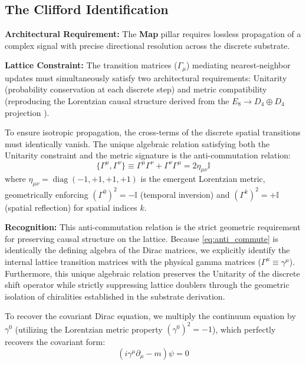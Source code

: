 \subsection{The Clifford Identification}

\textbf{Architectural Requirement:} The \textbf{Map} pillar requires lossless propagation of a complex signal with precise directional resolution across the discrete substrate.

\textbf{Lattice Constraint:} The transition matrices ($\Gamma_\mu$) mediating nearest-neighbor updates must simultaneously satisfy two architectural requirements: Unitarity (probability conservation at each discrete step) and metric compatibility (reproducing the Lorentzian causal structure derived from the $E_8 \to D_4 \oplus D_4$ projection \cite{meyer_informational_2026}). 

To ensure isotropic propagation, the cross-terms of the discrete spatial transitions must identically vanish. The unique algebraic relation satisfying both the Unitarity constraint and the metric signature is the anti-commutation relation:
\begin{equation}
    \{\Gamma^\mu, \Gamma^\nu\} \equiv \Gamma^\mu\Gamma^\nu + \Gamma^\nu\Gamma^\mu = 2\eta_{\mu\nu}\mathbb{I}
\label{eq:anti_commute}
\end{equation}
where $\eta_{\mu\nu} = \operatorname{diag}(-1,+1,+1,+1)$ is the emergent Lorentzian metric, geometrically enforcing $(\Gamma^0)^2 = -\mathbb{I}$ (temporal inversion) and $(\Gamma^k)^2 = +\mathbb{I}$ (spatial reflection) for spatial indices $k$.

\textbf{Recognition:} This anti-commutation relation is the strict geometric requirement for preserving causal structure on the lattice. Because \cref{eq:anti_commute} is identically the defining algebra of the Dirac matrices, we explicitly identify the internal lattice transition matrices with the physical gamma matrices ($\Gamma^\mu \equiv \gamma^\mu$). Furthermore, this unique algebraic relation preserves the Unitarity of the discrete shift operator while strictly suppressing lattice doublers through the geometric isolation of chiralities established in the substrate derivation\cite{meyer_informational_2026}.

To recover the covariant Dirac equation, we multiply the continuum equation by $\gamma^0$ (utilizing the Lorentzian metric property $(\gamma^0)^2 = -1$), which perfectly recovers the covariant form:
\begin{equation}
    (i\gamma^\mu \partial_\mu - m)\psi = 0
    \label{eq:covariant_dirac}
\end{equation}

